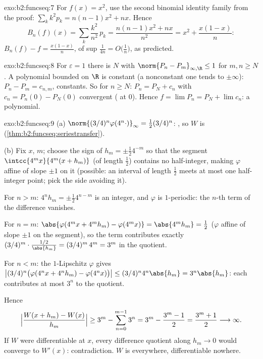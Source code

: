 \begin{solution}{exo:b2:funcseq:7}
For $f(x) = x^2$, use the second binomial identity family from the
proof: $\sum_k k^2 p_k = n(n-1)x^2 + nx$. Hence
\[
B_n(f)(x) = \sum_k \frac{k^2}{n^2}\,p_k
= \frac{n(n-1)x^2 + nx}{n^2}
= x^2 + \frac{x(1 - x)}{n} :
\]
$B_n(f) - f = \frac{x(1-x)}{n}$, of sup  $\frac{1}{4n} =
O\bigl(\frac1n\bigr)$, as predicted.
\end{solution}

\begin{solution}{exo:b2:funcseq:8}
For $\varepsilon = 1$ there is $N$ with $\norm{P_n - P_m}_{\infty,
\R} \leq 1$ for $m, n \geq N$. A polynomial bounded on $\R$ is
constant (a nonconstant one tends to $\pm\infty$): $P_n - P_m =
c_{n,m}$, constants. So for $n \geq N$: $P_n = P_N + c_n$ with
$c_n = P_n(0) - P_N(0)$ convergent ( at $0$).
Hence $f = \lim P_n = P_N + \lim c_n$: a polynomial.
\end{solution}

\begin{solution}{exo:b2:funcseq:9}
(a) $\norm{(3/4)^n\varphi(4^n\cdot)}_\infty = \frac12
(3/4)^n$: , so $W$ is 
(\cref{thm:b2:funcseq:seriestransfer}).

(b) Fix $x$, $m$; choose the sign of $h_m = \pm\frac12 4^{-m}$ so
that the segment $\intcc{4^mx}{4^m(x + h_m)}$ (of length $\frac12$)
contains no half-integer, making $\varphi$ affine of slope $\pm1$
on it (possible: an interval of length $\frac12$ meets at most one
half-integer point; pick the side avoiding it).

For $n > m$: $4^n h_m = \pm\frac12 4^{n-m}$ is an integer, and
$\varphi$ is $1$-periodic: the $n$-th term of the difference
vanishes.

For $n = m$: $\abs{\varphi(4^m x + 4^m h_m) - \varphi(4^m x)} =
\abs{4^m h_m} = \frac12$ ($\varphi$ affine of slope $\pm 1$ on the
segment), so the term contributes exactly $(3/4)^m \cdot
\frac{1/2}{\abs{h_m}} = (3/4)^m\,4^m = 3^m$ in the quotient.

For $n < m$: the $1$-Lipschitz $\varphi$ gives
$\bigl|(3/4)^n\bigl(\varphi(4^nx + 4^nh_m) -
\varphi(4^nx)\bigr)\bigr| \leq (3/4)^n 4^n\abs{h_m} =
3^n\abs{h_m}$: each contributes at most $3^n$ to the quotient.

Hence
\[
\Bigl|\frac{W(x + h_m) - W(x)}{h_m}\Bigr|
\geq 3^m - \sum_{n=0}^{m-1} 3^n
= 3^m - \frac{3^m - 1}{2} = \frac{3^m + 1}{2}
\longrightarrow \infty .
\]
If $W$ were differentiable at $x$, every difference quotient along
$h_m \to 0$ would converge to $W'(x)$: contradiction. $W$ is
 everywhere, differentiable nowhere.
\end{solution}

